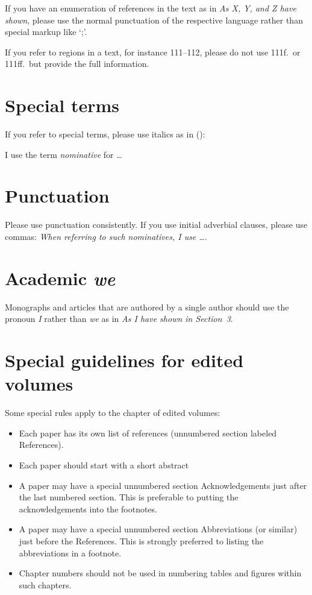 If you have an enumeration of references in the text as in \emph{As X, Y, and Z have shown}, please use
the normal punctuation of the respective language rather than special markup like `;'.

If you refer to regions in a text, for instance 111--112, please do not use 111f.\ or 111ff.\ but provide the
full information. 

\noindent
{}

\section{Special terms}

If you refer to special terms, please use italics as in ():

\ea
I use the term \emph{nominative} for \ldots
\z



\section{Punctuation}

Please use punctuation consistently. If you use initial adverbial clauses, please use commas:
\emph{When referring to such nominatives, I use \ldots}.


\section{Academic \emph{we}}

Monographs and articles that are authored by a single author should use the pronoun \emph{I} rather
than \emph{we} as in \emph{As I have shown in Section~3}.

\section{Special guidelines for edited volumes}


Some special rules apply to the chapter of edited volumes:
\begin{itemize}
\item Each paper has its own list of references (unnumbered section labeled References).
\item Each paper should start with a short abstract
\item A paper may have a special unnumbered section Acknowledgements just after the last numbered section. This is preferable to putting the acknowledgements into the footnotes.
\item A paper may have a special unnumbered section Abbreviations (or similar) just before the References. This is strongly preferred to listing the abbreviations in a footnote.
\item Chapter numbers should not be used in numbering tables and figures within such chapters.
\end{itemize}


